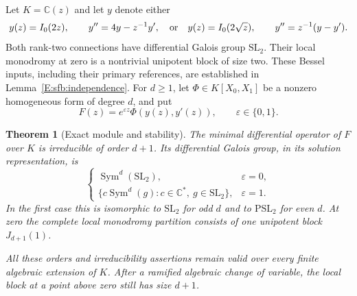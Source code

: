 \documentclass[11pt,a4paper]{article}
\newtheorem{theorem}{Theorem}[section]
\theoremstyle{definition}
\theoremstyle{remark}
\numberwithin{equation}{section}
\begin{document}
Let $K=\mathbb C(z)$ and let $y$ denote either
\[
 y(z)=I_0(2z),\qquad y''=4y-z^{-1}y',
 \quad\hbox{or}\quad
 y(z)=I_0(2\sqrt z),\qquad y''=z^{-1}(y-y').
\]
Both rank-two connections have differential Galois group $\mathrm{SL}_2$.
Their local monodromy at zero is a nontrivial unipotent block of size two.
These Bessel inputs, including their primary references, are
established in Lemma~\ref{E:sfb:independence}.
For $d\ge1$, let $\Phi\in K[X_0,X_1]$ be a nonzero homogeneous
form of degree $d$, and put
\[
 F(z)=e^{\varepsilon z}\Phi(y(z),y'(z)),\qquad
 \varepsilon\in\{0,1\}.
\]

\begin{theorem}[Exact module and stability]\label{E:acb:module}
The minimal differential operator of $F$ over $K$ is irreducible of
order $d+1$.  Its differential Galois group, in its solution
representation, is
\[
 \begin{cases}
 \operatorname{Sym}^{d}(\mathrm{SL}_2),&\varepsilon=0,\\
 \{c\operatorname{Sym}^{d}(g):c\in\mathbb C^*,\ g\in\mathrm{SL}_2\},
       &\varepsilon=1.
 \end{cases}
\]
In the first case this is isomorphic to $\mathrm{SL}_2$ for odd $d$
and to $\mathrm{PSL}_2$ for even $d$.
At zero the complete local monodromy partition consists of one
unipotent block $J_{d+1}(1)$.

All these orders and irreducibility assertions remain valid over
every finite algebraic extension of $K$.  After a ramified algebraic
change of variable, the local block at a point above zero still has
size $d+1$.
\end{theorem}
\end{document}
